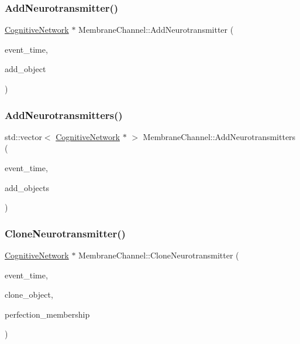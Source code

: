 \subsubsection{\texorpdfstring{Add\+Neurotransmitter()}{AddNeurotransmitter()}}
{\footnotesize\ttfamily \mbox{\hyperlink{classCognitiveNetwork}{Cognitive\+Network}} $\ast$ Membrane\+Channel\+::\+Add\+Neurotransmitter (\begin{DoxyParamCaption}\item[{std\+::chrono\+::time\+\_\+point$<$ \mbox{\hyperlink{universe_8h_a0ef8d951d1ca5ab3cfaf7ab4c7a6fd80}{Clock}} $>$}]{event\+\_\+time,  }\item[{\mbox{\hyperlink{classCognitiveNetwork}{Cognitive\+Network}} $\ast$}]{add\+\_\+object }\end{DoxyParamCaption})}

\mbox{\label{classMembraneChannel_a01fb5f3176cfa3423bb10a04bf69da01}} 
\subsubsection{\texorpdfstring{Add\+Neurotransmitters()}{AddNeurotransmitters()}}
{\footnotesize\ttfamily std\+::vector$<$ \mbox{\hyperlink{classCognitiveNetwork}{Cognitive\+Network}} $\ast$ $>$ Membrane\+Channel\+::\+Add\+Neurotransmitters (\begin{DoxyParamCaption}\item[{std\+::chrono\+::time\+\_\+point$<$ \mbox{\hyperlink{universe_8h_a0ef8d951d1ca5ab3cfaf7ab4c7a6fd80}{Clock}} $>$}]{event\+\_\+time,  }\item[{std\+::vector$<$ \mbox{\hyperlink{classCognitiveNetwork}{Cognitive\+Network}} $\ast$$>$}]{add\+\_\+objects }\end{DoxyParamCaption})}

\mbox{\label{classMembraneChannel_af667720bd2214ea3a1e6d272b57d3a79}} 
\subsubsection{\texorpdfstring{Clone\+Neurotransmitter()}{CloneNeurotransmitter()}}
{\footnotesize\ttfamily \mbox{\hyperlink{classCognitiveNetwork}{Cognitive\+Network}} $\ast$ Membrane\+Channel\+::\+Clone\+Neurotransmitter (\begin{DoxyParamCaption}\item[{std\+::chrono\+::time\+\_\+point$<$ \mbox{\hyperlink{universe_8h_a0ef8d951d1ca5ab3cfaf7ab4c7a6fd80}{Clock}} $>$}]{event\+\_\+time,  }\item[{\mbox{\hyperlink{classCognitiveNetwork}{Cognitive\+Network}} $\ast$}]{clone\+\_\+object,  }\item[{double}]{perfection\+\_\+membership }\end{DoxyParamCaption})}

